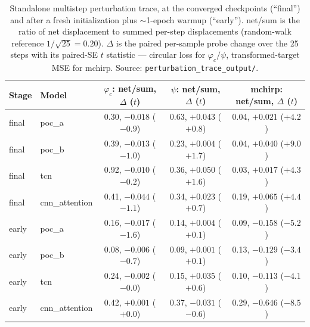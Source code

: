 \documentclass[11pt]{article}
\begin{document}
\begin{table}[tbp]
    \centering
    \caption{Standalone multistep perturbation trace, at the converged checkpoints (``final'') and after a fresh initialization plus ${\sim}$1-epoch warmup (``early'').
        net/sum is the ratio of net displacement to summed per-step displacements (random-walk reference $1/\sqrt{25} = 0.20$).
        $\Delta$ is the paired per-sample probe change over the 25 steps with its paired-SE $t$ statistic --- circular loss for $\varphi_c/\psi$, transformed-target MSE for mchirp.
        Source: \texttt{perturbation\_trace\_output/}.}
    \label{tab:phicpsi:trace}
    \small
    \begin{tabular}{@{}llccc@{}}
        \toprule
        Stage & Model & $\varphi_c$: net/sum, $\Delta$ ($t$) & $\psi$: net/sum, $\Delta$ ($t$) & mchirp: net/sum, $\Delta$ ($t$) \\
        \midrule
        final & poc\_a         & 0.30, $-0.018$ ($-0.9$) & 0.63, $+0.043$ ($+0.8$) & 0.04, $+0.021$ ($+4.2$) \\
        final & poc\_b         & 0.39, $-0.013$ ($-1.0$) & 0.23, $+0.004$ ($+1.7$) & 0.04, $+0.040$ ($+9.0$) \\
        final & tcn            & 0.92, $-0.010$ ($-0.2$) & 0.36, $+0.050$ ($+1.6$) & 0.03, $+0.017$ ($+4.3$) \\
        final & cnn\_attention & 0.41, $-0.044$ ($-1.1$) & 0.34, $+0.023$ ($+0.7$) & 0.19, $+0.065$ ($+4.4$) \\
        early & poc\_a         & 0.16, $-0.017$ ($-1.6$) & 0.14, $+0.004$ ($+0.1$) & 0.09, $\mathbf{-0.158}$ ($\mathbf{-5.2}$) \\
        early & poc\_b         & 0.08, $-0.006$ ($-0.7$) & 0.09, $+0.001$ ($+0.1$) & 0.13, $\mathbf{-0.129}$ ($\mathbf{-3.4}$) \\
        early & tcn            & 0.24, $-0.002$ ($-0.0$) & 0.15, $+0.035$ ($+0.6$) & 0.10, $\mathbf{-0.113}$ ($\mathbf{-4.1}$) \\
        early & cnn\_attention & 0.42, $+0.001$ ($+0.0$) & 0.37, $-0.031$ ($-0.6$) & 0.29, $\mathbf{-0.646}$ ($\mathbf{-8.5}$) \\
        \bottomrule
    \end{tabular}
\end{table}
\end{document}
